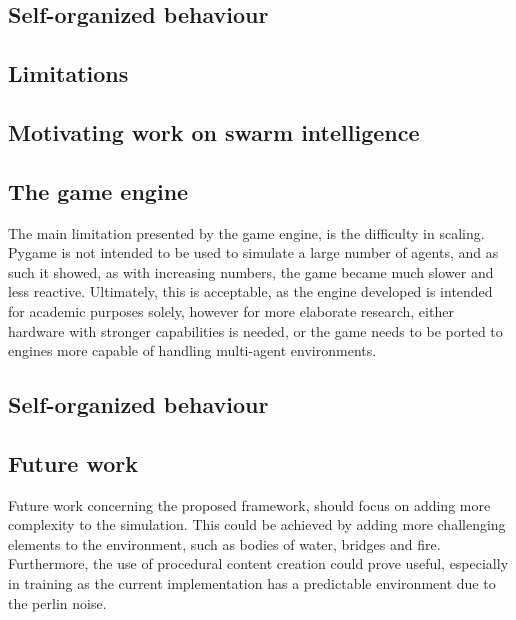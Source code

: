 \subsection*{Self-organized behaviour}
\textcolor{purple}{
    \blindtext
    \blindtext
}

\textcolor{purple}{
    \blindtext
    \blindtext
}

\subsection{Limitations} \label{subsection:limitations}

\subsection*{Motivating work on swarm intelligence}
\textcolor{purple}{
    \blindtext
    \blindtext
}

\subsection*{The game engine}
The main limitation presented by the game engine, is the difficulty in scaling.
Pygame is not intended to be used to simulate a large number of agents, and as such it showed, 
as with increasing numbers, the game became much slower and less reactive.
Ultimately, this is acceptable, as the engine developed is intended for academic purposes solely, 
however for more elaborate research, either hardware with stronger capabilities is needed, 
or the game needs to be ported to engines more capable of handling multi-agent environments.

\textcolor{purple}{
    \blindtext
    \blindtext
}

\subsection*{Self-organized behaviour}
\textcolor{purple}{
    \blindtext
    \blindtext
}



\subsection{Future work} \label{subsection:future_work}
Future work concerning the proposed framework, should focus on adding more complexity to the simulation.
This could be achieved by adding more challenging elements to the environment, such as bodies of water, bridges and fire.
Furthermore, the use of procedural content creation could prove useful, especially in training as the current implementation has a predictable environment due to the perlin noise.

\textcolor{purple}{
    \blindtext
    \blindtext
}
